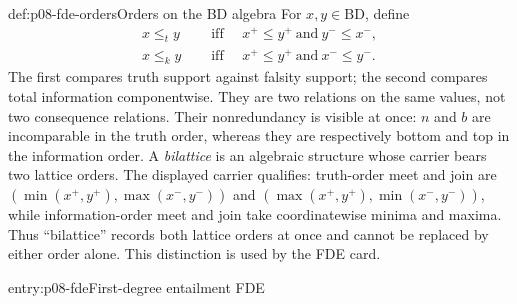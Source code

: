 \begin{hbdefinition}{def:p08-fde-orders}{Orders on the BD algebra}
For \(x,y\in\mathrm{BD}\), define
\[
\begin{aligned}
 x\leq_t y
 &\quad\text{ iff }\quad
 x^+\leq y^+\ \text{and}\ y^-\leq x^-,\\
 x\leq_k y
 &\quad\text{ iff }\quad
 x^+\leq y^+\ \text{and}\ x^-\leq y^-.
\end{aligned}
\]
The first compares truth support against falsity support; the second compares
total information componentwise.  They are two relations on the same values,
not two consequence relations.  Their nonredundancy is visible at once:
\(n\) and \(b\) are incomparable in the truth order, whereas
they are respectively bottom and top in the information order.  A
\emph{bilattice} is an algebraic structure whose carrier bears two lattice
orders.  The displayed carrier qualifies: truth-order meet and join are
\((\min(x^+,y^+),\max(x^-,y^-))\) and
\((\max(x^+,y^+),\min(x^-,y^-))\), while information-order meet and join take
coordinatewise minima and maxima.  Thus ``bilattice'' records both lattice
orders at once and cannot be replaced by either order alone.  This distinction
is used by the FDE card.
\end{hbdefinition}

\begin{systementry}{entry:p08-fde}{First-degree entailment FDE}
\end{systementry}

